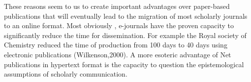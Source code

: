 \documentclass{article}
\begin{document}
These reasons seem to us to create important advantages over paper-based publications that will eventually lead to the migration of most scholarly journals to an online format. Most obviously , e-journals have the proven capacity to significantly reduce the time for dissemination. For example the Royal society of Chemistry reduced the time of production from 100 days to 40 days using electronic publications (Wilkenson,2000). A more esoteric advantage of Net publications in hypertext format is the capacity to question the epistemological assumptions of scholarly communication.
\end{document}
